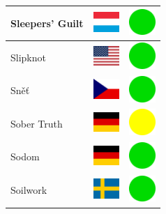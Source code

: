\documentclass[12pt, a4paper, twoside]{report}
\begin{document}
\begin{center}
\begin{longtable}{|p{5cm}|p{2cm}|p{2cm}|}
Sleepers' Guilt & \includegraphics[width=1cm]{4x3/lu} & \includegraphics[width=1cm]{likes/y} \\ \hline
Slipknot & \includegraphics[width=1cm]{4x3/us} & \includegraphics[width=1cm]{likes/y} \\ \hline
Sněť & \includegraphics[width=1cm]{4x3/cz} & \includegraphics[width=1cm]{likes/y} \\ \hline
Sober Truth & \includegraphics[width=1cm]{4x3/de} & \includegraphics[width=1cm]{likes/m} \\ \hline
Sodom & \includegraphics[width=1cm]{4x3/de} & \includegraphics[width=1cm]{likes/y} \\ \hline
Soilwork & \includegraphics[width=1cm]{4x3/se} & \includegraphics[width=1cm]{likes/y} \\ \hline

\end{longtable}
\end{center}
\end{document}

